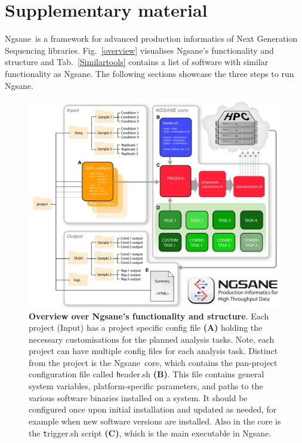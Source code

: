 \documentclass{article}
\newcommand{\prog}{{\sc Ngsane}}
\begin{document}
\pagestyle{empty}

\setcounter{section}{1}

\section*{Supplementary material}

\prog\ is a framework for advanced production informatics of Next Generation Sequencing libraries. Fig.~\ref{overview} visualises \prog 's functionality and structure and Tab.~\ref{Similartools} contains a list of software with similar functionality as \prog. The following sections showcase the three steps to run \prog.


\begin{figure}[ht!]
\centering
 \includegraphics[type=pdf,ext=.pdf,read=.pdf, width=120mm]{overview}
\caption{
{\bf Overview over \prog 's functionality and structure}. Each project (Input) has a project specific config file {\bf (A)} holding the necessary customisations for the planned analysis tasks. Note, each project can have multiple config files for each analysis task. Distinct from the project is the  \prog\ core, which contains the pan-project configuration file called {\texttt header.sh} {\bf (B)}. This file contains general system variables, platform-specific parameters, and paths to the various software binaries installed on a system. It should be configured once upon initial installation and updated as needed, for example when new software versions are installed. Also in the core is the  {\texttt trigger.sh} script {\bf (C)}, which is the main executable in \prog. 
}
\end{figure}
\end{document}
